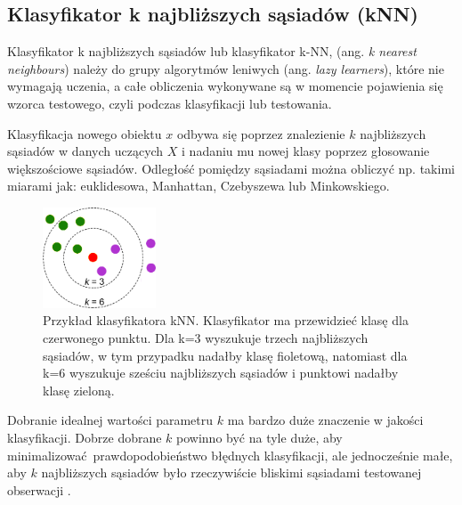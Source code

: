 \subsection{Klasyfikator k najbliższych sąsiadów (kNN)}
Klasyfikator k najbliższych sąsiadów lub klasyfikator k-NN, (ang. \textit{k nearest neighbours}) należy do grupy algorytmów leniwych (ang. \textit{lazy learners}), które nie wymagają uczenia, a całe obliczenia wykonywane są w momencie pojawienia się wzorca testowego, czyli podczas klasyfikacji lub testowania. \par
Klasyfikacja nowego obiektu $x$ odbywa się poprzez znalezienie $k$ najbliższych sąsiadów w danych uczących $X$ i nadaniu mu nowej klasy poprzez głosowanie większościowe sąsiadów. Odległość pomiędzy sąsiadami można obliczyć np. takimi miarami jak: euklidesowa, Manhattan, Czebyszewa lub Minkowskiego. \par
\begin{figure}[H]
	\centering
	\includegraphics[width=0.3\textwidth]{./images/knn.png}
	\caption[Przykład klasyfikatora kNN]{Przykład klasyfikatora kNN. Klasyfikator ma przewidzieć klasę dla czerwonego punktu. Dla k=3 wyszukuje trzech najbliższych sąsiadów, w tym przypadku nadałby klasę fioletową, natomiast dla k=6 wyszukuje sześciu najbliższych sąsiadów i punktowi nadałby klasę zieloną.}
	\label{fig:klasknn}
\end{figure}
Dobranie idealnej wartości parametru $k$ ma bardzo duże znaczenie w jakości klasyfikacji. Dobrze dobrane $k$ powinno być na tyle duże, aby minimalizować prawdopodobieństwo błędnych klasyfikacji, ale jednocześnie małe, aby $k$ najbliższych sąsiadów było rzeczywiście bliskimi sąsiadami testowanej obserwacji \cite{Bishop}. 
